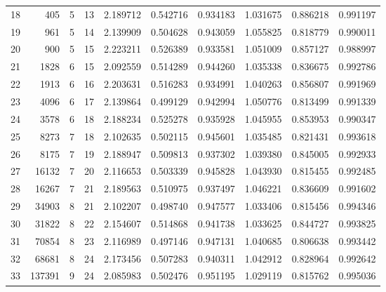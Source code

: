 \documentclass[12pt]{amsart}
\begin{document}
\begin{table}
{\begin{tabular}{|r|rrrrrrrrr|}
\\
 18 &405 
& 5
& 13
&  2.189712 & 0.542716 &0.934183	
& 1.031675 & 0.886218 &0.991197	


\\
 19 &961 
& 5
& 14
&  2.139909 & 0.504628 &0.943059	
& 1.055825 & 0.818779 &0.990011	


\\
 20 &900 
& 5
& 15
&  2.223211 & 0.526389 &0.933581	
& 1.051009 & 0.857127 &0.988997	


\\
 21 &1828 
& 6
& 15
&  2.092559 & 0.514289 &0.944260	
& 1.035338 & 0.836675 &0.992786	


\\
 22 &1913 
& 6
& 16
&  2.203631 & 0.516283 &0.934991	
& 1.040263 & 0.856807 &0.991969	


\\
 23 &4096 
& 6
& 17
&  2.139864 & 0.499129 &0.942994	
& 1.050776 & 0.813499 &0.991339	


\\
 24 &3578 
& 6
& 18
&  2.188234 & 0.525278 &0.935928	
& 1.045955 & 0.853953 &0.990347	


\\
 25 &8273 
& 7
& 18
&  2.102635 & 0.502115 &0.945601	
& 1.035485 & 0.821431 &0.993618	


\\
 26 &8175 
& 7
& 19
&  2.188947 & 0.509813 &0.937302	
& 1.039380 & 0.845005 &0.992933	


\\
 27 &16132 
& 7
& 20
&  2.116653 & 0.503339 &0.945828	
& 1.043930 & 0.815455 &0.992485	


\\
 28 &16267 
& 7
& 21
&  2.189563 & 0.510975 &0.937497	
& 1.046221 & 0.836609 &0.991602	


\\
 29 &34903 
& 8
& 21
&  2.102207 & 0.498740 &0.947577	
& 1.033406 & 0.815456 &0.994346	


\\
 30 &31822 
& 8
& 22
&  2.154607 & 0.514868 &0.941738	
& 1.033625 & 0.844727 &0.993825	


\\
 31 &70854 
& 8
& 23
&  2.116989 & 0.497146 &0.947131	
& 1.040685 & 0.806638 &0.993442	


\\
 32 &68681 
& 8
& 24
&  2.173456 & 0.507283 &0.940311	
& 1.042912 & 0.828964 &0.992642	


\\
 33 &137391 
& 9
& 24
&  2.085983 & 0.502476 &0.951195	
& 1.029119 & 0.815762 &0.995036	



\end{tabular}}
\end{table}
\end{document}
